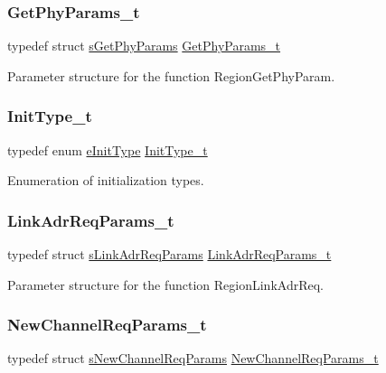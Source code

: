 \subsubsection{\texorpdfstring{Get\+Phy\+Params\+\_\+t}{GetPhyParams\_t}}
{\footnotesize\ttfamily typedef struct \hyperlink{structsGetPhyParams}{s\+Get\+Phy\+Params} \hyperlink{group__REGION_gab471483fff904f4f89bbc03f7fc380ab}{Get\+Phy\+Params\+\_\+t}}

Parameter structure for the function Region\+Get\+Phy\+Param. \mbox{\label{group__REGION_gaddc73ae10673ec925724e7870363bda9}} 
\subsubsection{\texorpdfstring{Init\+Type\+\_\+t}{InitType\_t}}
{\footnotesize\ttfamily typedef enum \hyperlink{group__REGION_ga11ecad794560a3d3961bdf1c9a27d3b2}{e\+Init\+Type} \hyperlink{group__REGION_gaddc73ae10673ec925724e7870363bda9}{Init\+Type\+\_\+t}}

Enumeration of initialization types. \mbox{\label{group__REGION_gad4af503e8d4de1846129e26a799a1e8e}} 
\subsubsection{\texorpdfstring{Link\+Adr\+Req\+Params\+\_\+t}{LinkAdrReqParams\_t}}
{\footnotesize\ttfamily typedef struct \hyperlink{structsLinkAdrReqParams}{s\+Link\+Adr\+Req\+Params} \hyperlink{group__REGION_gad4af503e8d4de1846129e26a799a1e8e}{Link\+Adr\+Req\+Params\+\_\+t}}

Parameter structure for the function Region\+Link\+Adr\+Req. \mbox{\label{group__REGION_gae2abcdb6dbb843c9faf5fd3009eca9d6}} 
\subsubsection{\texorpdfstring{New\+Channel\+Req\+Params\+\_\+t}{NewChannelReqParams\_t}}
{\footnotesize\ttfamily typedef struct \hyperlink{structsNewChannelReqParams}{s\+New\+Channel\+Req\+Params} \hyperlink{group__REGION_gae2abcdb6dbb843c9faf5fd3009eca9d6}{New\+Channel\+Req\+Params\+\_\+t}}

